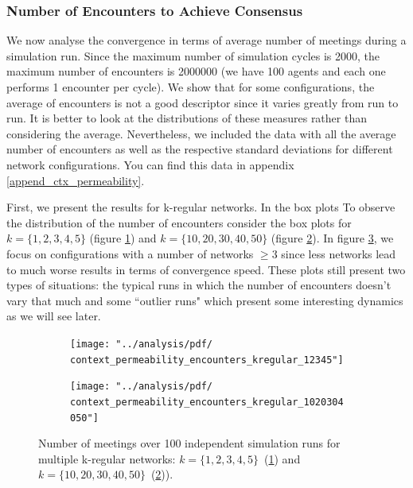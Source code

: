 \documentclass[preprint,number]{elsarticle}
\begin{document}
\subsubsection{Number of Encounters to Achieve Consensus}
\label{sec:ctx_perm_encounters}
We now analyse the convergence in terms of average number of meetings during a simulation run. Since the maximum number of simulation cycles is 2000, the maximum number of encounters is 2000000 (we have 100 agents and each one performs 1 encounter per cycle). We show that for some configurations, the average of encounters is not a good descriptor since it varies greatly from run to run. It is better to look at the distributions of these measures rather than considering the average. Nevertheless, we included the data with all the average number of encounters as well as the respective standard deviations for different network configurations. You can find this data in appendix \ref{append_ctx_permeability}.

First, we present the results for k-regular networks. In the box plots To observe the distribution of the number of encounters consider the box plots for $k = \{1,2,3,4,5\}$ (figure \ref{fig:ctx_perm_kreg_12345}) and $k =\{10,20,30,40,50\}$ (figure \ref{fig:ctx_perm_kreg_1020304050}). In figure \ref{fig:ctx_perm_kreg}, we focus on configurations with a number of networks $\ge 3$ since less networks lead to much worse results in terms of convergence speed. These plots still present two types of situations: the typical runs in which the number of encounters doesn't vary that much and some ``outlier runs" which present some interesting dynamics as we will see later.

\begin{figure}[H]
	\centering
	\begin{subfigure}{.49\linewidth}
		\centering
		\texttt{[image: "../analysis/pdf/ context\_permeability\_encounters\_kregular\_12345"]}
		\caption{}
		\label{fig:ctx_perm_kreg_12345}
	\end{subfigure}%
	\begin{subfigure}{.49\linewidth}
		\centering
		\texttt{[image: "../analysis/pdf/ context\_permeability\_encounters\_kregular\_1020304050"]}
		\caption{}
		\label{fig:ctx_perm_kreg_1020304050}
	\end{subfigure}
	\begin{minipage}{0.9\linewidth}
		\vspace{0.2cm}
		\caption{Number of meetings over 100 independent simulation runs for multiple k-regular networks: $k=\{1,2,3,4,5\}$~(\ref{fig:ctx_perm_kreg_12345}) and $k=\{10,20,30,40,50\}$~(\ref{fig:ctx_perm_kreg_1020304050})).}
		\label{fig:ctx_perm_kreg}
	\end{minipage}
\end{figure}
\end{document}
